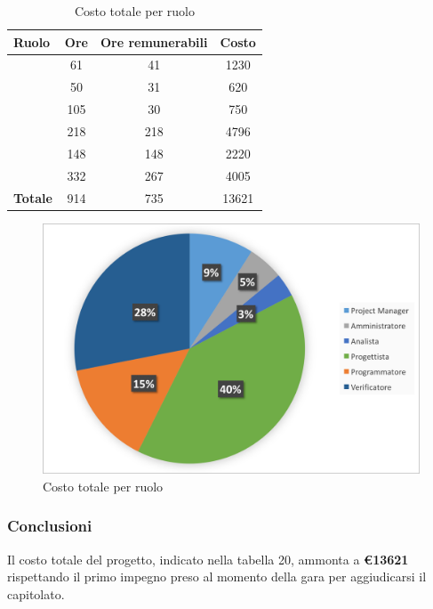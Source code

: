 \begin{table}[h]
	\begin{center}
		\begin{tabular}{|l|c|c|c|}
			\hline
			\textbf{Ruolo}	& \textbf{Ore} &	\textbf{Ore remunerabili}	 &\textbf{Costo} \\
			\hline
			\textit{\Pm}	&	61	&	41	&	1230	\\
			\hline
			\textit{\Am}	&	50	&	31	&	620	\\
			\hline
			\textit{\An}	&	105	&	30	&	750	\\
			\hline
			\textit{\Prog}	&	218	&	218	&	4796	\\
			\hline
			\textit{\Progr}	&	148	&	148	&	2220	\\
			\hline
			\textit{\Ver}	&	332	&	267	&	4005	\\
			\hline
			\textbf{Totale}	&	914 & 735 & 13621	\\
			\hline
		\end{tabular}
	\end{center}
	\caption{Costo totale per ruolo}
\end{table}

\begin{figure}[H]
	\centering 
	\includegraphics[scale=0.7]{Immagini/GraficiTorteSezione6/TOT.png}
	\caption{Costo totale per ruolo}
\end{figure}

\subsubsection{Conclusioni}
Il costo totale del progetto, indicato nella tabella 20, ammonta a \textbf{\euro 13621} rispettando il primo impegno preso al momento della gara per aggiudicarsi il capitolato.\\